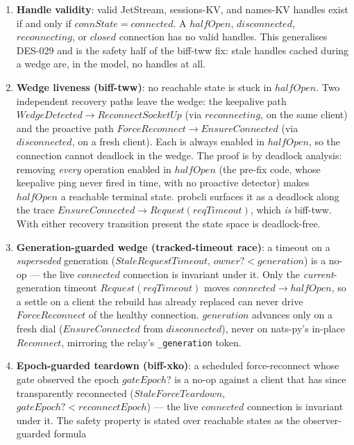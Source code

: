 \documentclass[a4paper,10pt,fleqn]{article}
\begin{document}
\begin{enumerate}
  \item \textbf{Handle validity}: valid JetStream, sessions-KV, and
    names-KV handles exist if and only if $connState = connected$.
    A $halfOpen$, $disconnected$, $reconnecting$, or $closed$
    connection has no valid handles.  This generalises DES-029 and
    is the safety half of the biff-tww fix: stale handles cached
    during a wedge are, in the model, no handles at all.

  \item \textbf{Wedge liveness (biff-tww)}: no reachable state is
    stuck in $halfOpen$.  Two independent recovery paths leave the
    wedge: the keepalive path $WedgeDetected \to ReconnectSocketUp$ (via
    $reconnecting$, on the same client) and the proactive path
    $ForceReconnect \to EnsureConnected$ (via $disconnected$, on a
    fresh client).  Each is always enabled in $halfOpen$, so the
    connection cannot deadlock in the wedge.  The proof is by
    deadlock analysis: removing \emph{every} operation enabled in
    $halfOpen$ (the pre-fix code, whose keepalive ping never fired
    in time, with no proactive detector) makes $halfOpen$ a
    reachable terminal state.  probcli surfaces it as a deadlock
    along the trace $EnsureConnected \to Request(reqTimeout)$,
    which \emph{is} biff-tww.  With either recovery transition
    present the state space is deadlock-free.

  \item \textbf{Generation-guarded wedge (tracked-timeout race)}: a
    timeout on a \emph{superseded} generation
    ($StaleRequestTimeout$, $owner? < generation$) is a no-op ---
    the live $connected$ connection is invariant under it.  Only
    the \emph{current}-generation timeout $Request(reqTimeout)$
    moves $connected \to halfOpen$, so a settle on a client the
    rebuild has already replaced can never drive $ForceReconnect$
    of the healthy connection.  $generation$ advances only on a
    fresh dial ($EnsureConnected$ from $disconnected$), never on
    nats-py's in-place $Reconnect$, mirroring the relay's
    \texttt{\_generation} token.

  \item \textbf{Epoch-guarded teardown (biff-xko)}: a scheduled
    force-reconnect whose gate observed the epoch $gateEpoch?$ is a no-op
    against a client that has since transparently reconnected
    ($StaleForceTeardown$, $gateEpoch? < reconnectEpoch$) --- the live
    $connected$ connection is invariant under it.  The safety property is
    stated over reachable states as the observer-guarded formula


\end{enumerate}
\end{document}
